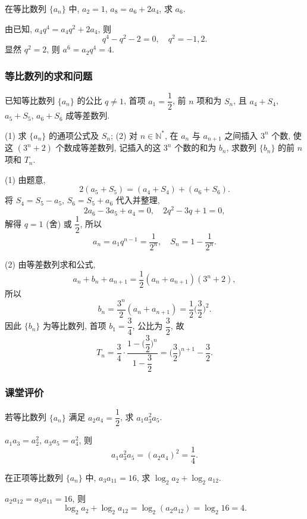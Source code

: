 \begin{exercise}
    在等比数列 $\{a_n\}$ 中, $a_2=1$, $a_8=a_6 +2a_4$, 求 $a_6$.
\end{exercise}
\beginsolution
    由已知, $a_4 q^4= a_4q^2+ 2a_4$, 则
    \[q^4- q^2- 2=0,\quad q^2=-1,2.\]
    显然 $q^2=2$, 则 $a^6= a_2 q^4= 4$.
\endsolution

\subsubsection{等比数列的求和问题}
\begin{example}
    已知等比数列 $\{a_n\}$ 的公比 $q\neq 1$, 首项 $a_1=\dfrac12$, 前 $n$ 项和为 $S_n$, 且 $a_4 +S_4$, $a_5+S_5$, $a_6+S_6$ 成等差数列.
    
    (1) 求 $\{a_n\}$ 的通项公式及 $S_n$;\qquad
    (2) 对 $n\in\mathbb{N}^*$, 在 $a_n$ 与 $a_{n+1}$ 之间插入 $3^n$ 个数, 使这 $(3^n+2)$ 个数成等差数列, 记插入的这 $3^n$ 个数的和为 $b_n$, 求数列 $\{b_n\}$ 的前 $n$ 项和 $T_n$.
\end{example}
\beginsolution
    (1) 由题意, 
    \[2(a_5+S_5)= (a_4 +S_4)+ (a_6+S_6).\]
    将 $S_4= S_5- a_5$, $S_6= S_5+a_6$ 代入并整理,
    \[2a_6- 3a_5+a_4=0,\quad 2q^2-3q+1=0,\]
    解得 $q=1$ (舍) 或 $\dfrac12$, 所以
    \[a_n= a_1 q^{n-1}= \frac1{2^n},\quad
        S_n= 1-\frac1{2^n}.\]
    
    (2) 由等差数列求和公式,
    \[a_n+b_n+a_{n+1}= \frac12(a_n+a_{n+1})(3^n+2),\]
    所以
    \[b_n= \frac{3^n}2(a_n+ a_{n+1})
        = \frac12\biggl(\frac32\biggr)^2.\]
    因此 $\{b_n\}$ 为等比数列, 首项 $b_1= \dfrac34$, 公比为 $\dfrac32$, 故
    \[T_n= \frac34\cdot\frac{1-\biggl(\dfrac32\biggr)^n}{1-\dfrac32}
        = \biggl(\frac32\biggr)^{n+1}- \frac32.\]
\endsolution

\subsubsection{课堂评价}
\begin{exercise}
    若等比数列 $\{a_n\}$ 满足 $a_2 a_4=\dfrac12$, 求 $a_1 a_3^2 a_5$.
\end{exercise}
\beginsolution
    $a_1 a_3= a_2^2$, $a_3 a_5= a_4^2$, 则
    \[a_1 a_3^2 a_5= (a_2 a_4)^2= \frac14.\]
\endsolution

\begin{exercise}
    在正项等比数列 $\{a_n\}$ 中, $a_3 a_{11} =16$, 求 $\log_2 a_2 +\log_2 a_{12}$.
\end{exercise}
\beginsolution
    $a_2 a_{12}= a_3 a_{11}= 16$, 则
    \[\log_2 a_2 +\log_2 a_{12}= \log_2 (a_2a_{12})
        = \log_2 16= 4.\]
\endsolution

